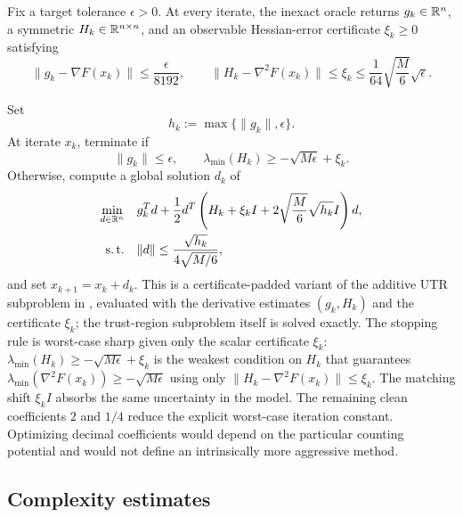 \documentclass{article}
\begin{document}
\begin{assumption}
\label{ass:inexact-oracle}
Fix a target tolerance $\epsilon>0$.  At every iterate, the inexact
oracle returns $g_k\in\mathbb{R}^n$, a symmetric
$H_k\in\mathbb{R}^{n\times n}$, and an observable Hessian-error certificate
$\xi_k\ge0$ satisfying
\begin{equation}\label{eq:generic-oracle-errors}
  \|g_k-\nabla F(x_k)\|\le\frac{\epsilon}{8192},
  \qquad
  \|H_k-\nabla^2F(x_k)\|\le\xi_k
  \le\frac1{64}\sqrt{\frac M6}\sqrt\epsilon.
\end{equation}
\end{assumption}
Set
\begin{equation}\label{eq:generic-scale}
  h_k:=\max\{\|g_k\|,\epsilon\}.
\end{equation}
At iterate $x_k$, terminate if
\begin{equation}\label{eq:generic-stopping-test}
 \|g_k\|\le\epsilon,
 \qquad
 \lambda_{\min}(H_k)\ge-\sqrt{M\epsilon}+\xi_k.
\end{equation}
Otherwise, compute a global solution $d_k$ of
\begin{equation}\label{eq:generic-subproblem}
\begin{aligned}
  \min_{d\in\mathbb{R}^n}\quad
  &g_k^Td+\frac12d^T\left(
    H_k+\xi_kI+2\sqrt{\frac M6}\sqrt{h_k}I\right)d,\\
  \operatorname{s.t.}\quad
  &\|d\|\le\frac{\sqrt{h_k}}{4\sqrt{M/6}},
\end{aligned}
\end{equation}
and set $x_{k+1}=x_k+d_k$.  This is a certificate-padded variant of
the additive UTR subproblem in \citet{jiang2026utr}, evaluated with
the derivative estimates $(g_k,H_k)$ and the certificate $\xi_k$;
the trust-region subproblem itself is solved exactly.
The stopping rule is worst-case sharp given only the scalar
certificate $\xi_k$:
$\lambda_{\min}(H_k)\ge-\sqrt{M\epsilon}+\xi_k$ is the weakest
condition on $H_k$ that guarantees
$\lambda_{\min}(\nabla^2F(x_k))\ge-\sqrt{M\epsilon}$ using only
$\|H_k-\nabla^2F(x_k)\|\le\xi_k$.  The matching shift $\xi_kI$
absorbs the same uncertainty in the model.  The remaining clean
coefficients $2$ and $1/4$ reduce the explicit worst-case iteration
constant.  Optimizing decimal coefficients would depend on the
particular counting potential and would not define an intrinsically
more aggressive method.

\subsection{Complexity estimates}
\end{document}
